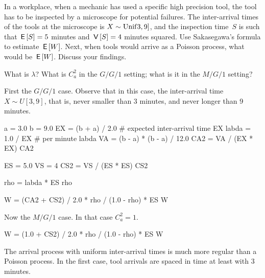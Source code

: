 \documentclass[queueing-book.tex]{subfiles}
\begin{document}
\begin{exercise}\label{ex:91}
In a workplace, when a mechanic has used a specific high precision tool, the tool has to be inspected by a microscope for potential failures.
The inter-arrival times of the tools at the microscope is $X\sim \mathrm{Unif}3, 9]$, and the inspection time~$S$ is such that $\,\mathsf{E}\left[S\right] = 5$ minutes and $\,\mathsf{V}\left[S\right] = 4$ minutes squared.
Use Sakasegawa's formula to estimate $\,\mathsf{E}\left[W\right]$.
Next, when tools would arrive as a Poisson process, what would be $\,\mathsf{E}\left[W\right]$.
Discuss your findings.
\begin{hint}
  What is $\lambda$? What is $C_a^2$ in the $G/G/1$ setting; what is it in the $M/G/1$ setting?
\end{hint}

\begin{solution}
First the $G/G/1$ case. Observe that in this case, the inter-arrival time $X\sim U[3,9]$, that is, never smaller than 3 minutes, and never longer than 9 minutes.

\begin{pyconsole}
a = 3.0
b = 9.0
EX = (b + a) / 2.0  # expected inter-arrival time
EX
labda = 1.0 / EX  # per minute
labda
VA = (b - a) * (b - a) / 12.0
CA2 = VA / (EX * EX)
CA2

ES = 5.0
VS = 4
CS2 = VS / (ES * ES)
CS2

rho = labda * ES
rho

W = (CA2 + CS2) / 2.0 * rho / (1.0 - rho) * ES
W
\end{pyconsole}

Now the $M/G/1$ case. In that case $C_a^2=1$.
\begin{pyconsole}
W = (1.0 + CS2) / 2.0 * rho / (1.0 - rho) * ES
W
\end{pyconsole}

The arrival process with uniform inter-arrival times is much more regular than a Poisson process.
In the first case, tool arrivals are spaced in time at least with 3 minutes.
\end{solution}
\end{exercise}


\end{document}
